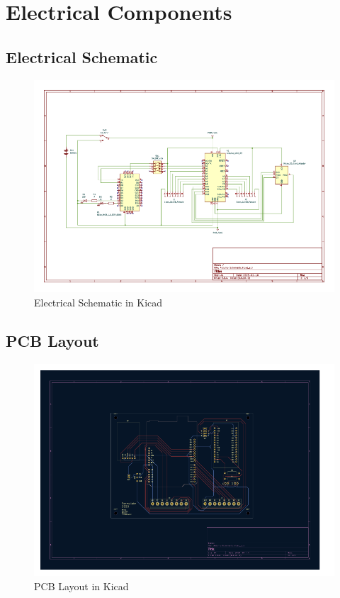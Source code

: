 \documentclass[12pt, titlepage]{article}
\begin{document}
\newpage
\section{Electrical Components}

\subsection{Electrical Schematic}
\begin{figure}[h!]
  \begin{center}
  \includegraphics[width=1.1\textwidth]{Electrical_Schematic}
  \caption{Electrical Schematic in Kicad}
  \end{center}
  \end{figure}
  \newpage

\subsection{PCB Layout}
\begin{figure}[h!]
  \begin{center}
  \includegraphics[width=1.1\textwidth]{PCB_Schematic}
  \caption{PCB Layout in Kicad}
  \end{center}
  \end{figure}
  \newpage
\end{document}
